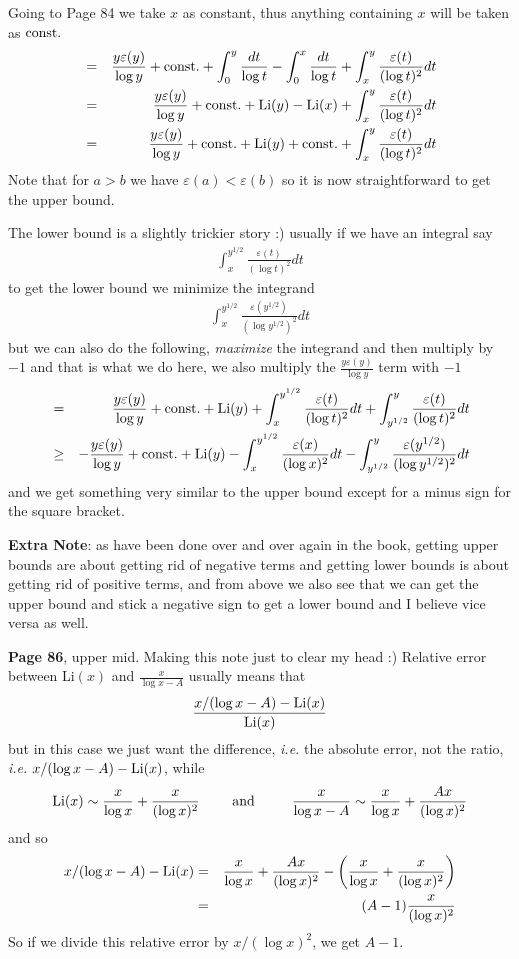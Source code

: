 \documentclass[aps,preprint,preprintnumbers,nofootinbib,showpacs,prd]{revtex4-1}
\newcommand{\ie}{{\it i.e.} }
\newcommand{\nbea}{\begin{eqnarray*}}
\newcommand{\neea}{\end{eqnarray*}}
\begin{document}
Going to Page 84 we take $x$ as constant, thus anything containing $x$ will be taken as ${\rm const.}$
%
\nbea
& = & \frac{y\varepsilon(y)}{\log y} + {\rm const.} + \int_0^y \frac{dt}{\log t} - \int_0^x \frac{dt}{\log t} + \int_x^y \frac{\varepsilon(t)}{(\log t)^2} dt \\
& = & \frac{y\varepsilon(y)}{\log y} + {\rm const.} + {\rm Li}(y) - {\rm Li}(x) + \int_x^y \frac{\varepsilon(t)}{(\log t)^2} dt \\
& = & \frac{y\varepsilon(y)}{\log y} + {\rm const.} + {\rm Li}(y) + {\rm const.} + \int_x^y \frac{\varepsilon(t)}{(\log t)^2} dt
\neea
%
Note that for $a > b$ we have $\varepsilon(a) < \varepsilon(b)$ so it is now straightforward to get the upper bound.

The lower bound is a slightly trickier story :) usually if we have an integral say
%
\nbea
\int_x^{y^{1/2}} \frac{\varepsilon(t)}{(\log t)^2} dt
\neea
%
to get the lower bound we minimize the integrand
%
\nbea
\int_x^{y^{1/2}} \frac{\varepsilon(y^{1/2})}{(\log y^{1/2})^2} dt
\neea
%
but we can also do the following, {\it maximize} the integrand and then multiply by $-1$ and that is what we do here, we also multiply the $\frac{y\varepsilon(y)}{\log y}$ term with $-1$
%
\nbea
& = & \frac{y\varepsilon(y)}{\log y} + {\rm const.} + {\rm Li}(y) + \int_x^{y^{1/2}} \frac{\varepsilon(t)}{(\log t)^2} dt + \int_{y^{1/2}}^y \frac{\varepsilon(t)}{(\log t)^2} dt \\
& \ge & -\frac{y\varepsilon(y)}{\log y} + {\rm const.} + {\rm Li}(y) - \int_x^{y^{1/2}} \frac{\varepsilon(x)}{(\log x)^2} dt - \int_{y^{1/2}}^y \frac{\varepsilon(y^{1/2})}{(\log y^{1/2})^2} dt
\neea
%
and we get something very similar to the upper bound except for a minus sign for the square bracket.

{\bf Extra Note}: as have been done over and over again in the book, getting upper bounds are about getting rid of negative terms and getting lower bounds is about getting rid of positive terms, and from above we also see that we can get the upper bound and stick a negative sign to get a lower bound and I believe vice versa as well.



{\bf Page 86}, upper mid. Making this note just to clear my head :) Relative error between Li$(x)$ and $\frac{x}{\log x - A}$ usually means that
%
\nbea
\frac{x/(\log x - A) - {\rm Li}(x)}{{\rm Li}(x)}
\neea
%
but in this case we just want the difference, \ie the absolute error, not the ratio, \ie $x/(\log x - A) - {\rm Li}(x)$, while
%
\nbea
{\rm Li}(x) \sim \frac{x}{\log x} + \frac{x}{(\log x)^2} ~~~~~~~{\rm and}~~~~~~~~\frac{x}{\log x - A} \sim \frac{x}{\log x} + \frac{Ax}{(\log x)^2}
\neea
%
and so
%
\nbea
x/(\log x - A) - {\rm Li}(x) & = & \frac{x}{\log x} + \frac{Ax}{(\log x)^2} - \left (\frac{x}{\log x} + \frac{x}{(\log x)^2} \right ) \\
& = & (A-1)\frac{x}{(\log x)^2}
\neea
%
So if we divide this relative error by $x/(\log x)^2$, we get $A-1$.
\end{document}
